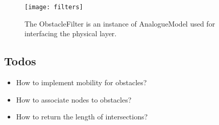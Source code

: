 \begin{figure}
  \centering
  \texttt{[image: filters]}
  \caption{The ObstacleFilter is an instance of AnalogueModel used for
    interfacing the physical layer.}
  \label{fig:filters}
\end{figure}


\subsection{Todos}

\begin{itemize}
\item How to implement mobility for obstacles?
\item How to associate nodes to obstacles?
\item How to return the length of intersections?
\end{itemize}



